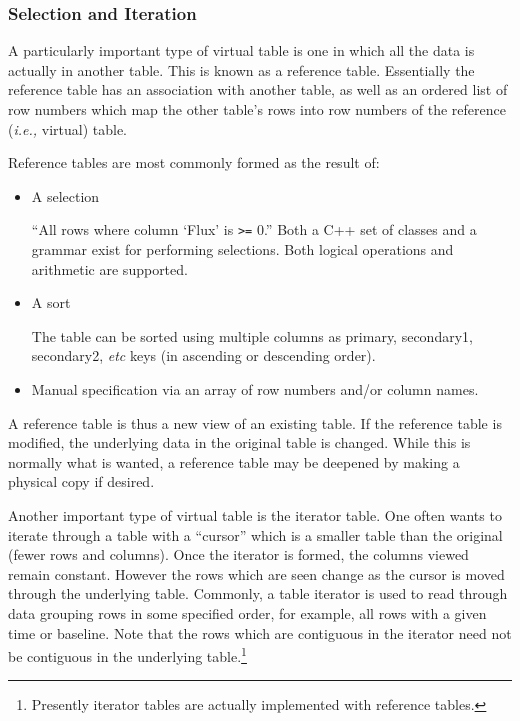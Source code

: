 \subsubsection{Selection and Iteration}
\label{sec:Selection}

A particularly important type of virtual table is one in which all the
data is actually in another table. This is known as a reference table.
Essentially the reference table has an association with another
table, as well as an ordered list of row numbers which map the other
table's rows into row numbers of the reference ({\em i.e.,} virtual) table.

Reference tables are most commonly formed as the result of:
\begin{itemize}
\item A selection

    ``All rows where column `Flux' is {\tt >=} 0.'' Both a C++ set of
    classes and a grammar exist for performing selections. Both
     logical operations and arithmetic are supported.

\item A sort

    The table can be sorted using multiple columns as primary,
    secondary1, secondary2, {\em etc} keys (in ascending or descending
    order).

\item Manual specification via an array of row numbers and/or column names.
\end{itemize}

A reference table is thus a new view of an existing table. If the
reference table is modified, the underlying data in the original table
is changed. While this is normally what is wanted, a reference table
may be deepened by making a physical copy if desired.

Another important type of virtual table is the iterator table. One
often wants to iterate through a table with a ``cursor'' which is a
smaller table than the original (fewer rows and columns). Once the
iterator is formed, the columns viewed remain constant. However the
rows which are seen change as the cursor is moved through the
underlying table. Commonly, a table iterator is used to read through
data grouping rows in some specified order, for example, all rows with
a given time or baseline. Note that the rows which are contiguous in
the iterator need not be contiguous in the underlying
table.\footnote{Presently iterator tables are actually implemented
with reference tables.}

